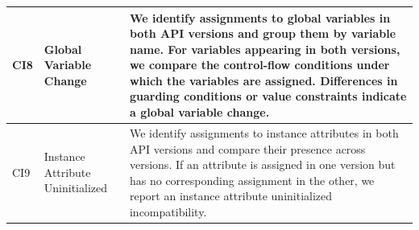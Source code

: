 \begin{table}[!t]
\begin{tabular}{p{0.5cm} p{2.0cm} p{14.0cm}}
    \\\hline
    CI8 & Global Variable Change
    & 
    We identify assignments to global variables in both API versions and group them by variable name. For variables appearing in both versions, we compare the control-flow conditions under which the variables are assigned. Differences in guarding conditions or value constraints indicate a global variable change.
    \\
    \hline
    CI9 & Instance Attribute Uninitialized
    & 
    We identify assignments to instance attributes in both API versions and compare their presence across versions. If an attribute is assigned in one version but has no corresponding assignment in the other, we report an instance attribute uninitialized incompatibility.
    \\
    \bottomrule
  \end{tabular}%
\end{table}